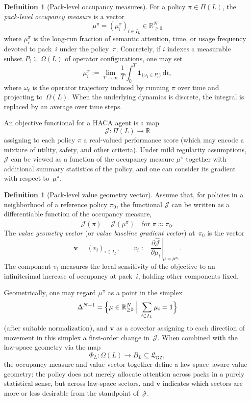 \documentclass[11pt]{book}
\theoremstyle{plain}
\theoremstyle{definition}
\newtheorem{definition}[theorem]{Definition}
\theoremstyle{remark}
\newcommand{\GZLS}{\ensuremath{\mathfrak{L}_{\mathrm{GZ}}}}       \newcommand{\GZLT}{\ensuremath{M_{!w}}}                           \newcommand{\GZLOC}{\ensuremath{A_M}}                             \newcommand{\GZLC}{\ensuremath{\omega_{\mathrm{law}}}}            \newcommand{\GZLCurv}{\ensuremath{\mathcal{F}_{\mathrm{law}}}}
\begin{document}
\begin{definition}[Pack-level occupancy measures]
\label{def:pack-occupancy-measures}
For a policy $\pi\in\Pi(L)$, the \emph{pack-level occupancy measure} is
a vector
\[
  \mu^\pi
  =
  (\mu_i^\pi)_{i\in I_L}
  \in\mathbb{R}_{\ge 0}^N
\]
where $\mu_i^\pi$ is the long-run fraction of semantic attention,
time, or usage frequency devoted to pack~$i$ under the policy~$\pi$.
Concretely, if $i$ indexes a measurable subset $P_i\subseteq\Omega(L)$
of operator configurations, one may set
\[
  \mu_i^\pi
  :=
  \lim_{T\to\infty}\frac{1}{T}\int_0^T
    \mathbf{1}_{\{\omega_t\in P_i\}}\,\mathrm{d}t,
\]
where $\omega_t$ is the operator trajectory induced by running $\pi$
over time and projecting to~$\Omega(L)$. When the underlying dynamics
is discrete, the integral is replaced by an average over time steps.
\end{definition}

An objective functional for a HACA agent is a map
\[
  \mathcal{J} : \Pi(L)\longrightarrow \mathbb{R}
\]
assigning to each policy $\pi$ a real-valued performance score
(which may encode a mixture of utility, safety, and other criteria).
Under mild regularity assumptions, $\mathcal{J}$ can be viewed as a
function of the occupancy measure $\mu^\pi$ together with additional
summary statistics of the policy, and one can consider its gradient
with respect to~$\mu^\pi$.

\begin{definition}[Pack-level value geometry vector]
\label{def:pack-value-geometry}
Assume that, for policies in a neighborhood of a reference policy
$\pi_0$, the functional $\mathcal{J}$ can be written as a differentiable
function of the occupancy measure,
\[
  \mathcal{J}(\pi)
  =
  \widehat{\mathcal{J}}(\mu^\pi)
  \quad\text{for }\pi\approx\pi_0.
\]
The \emph{value geometry vector} (or \emph{value baseline gradient
vector}) at~$\pi_0$ is the vector
\[
  \mathbf{v}
  =
  (v_i)_{i\in I_L},
  \qquad
  v_i
  :=
  \left.
    \frac{\partial \widehat{\mathcal{J}}}{\partial \mu_i}
  \right|_{\mu=\mu^{\pi_0}}.
\]
The component $v_i$ measures the local sensitivity of the objective to
an infinitesimal increase of occupancy at pack~$i$, holding other
components fixed.
\end{definition}

Geometrically, one may regard $\mu^\pi$ as a point in the simplex
\[
  \Delta^{N-1}
  =
  \Bigl\{
    \mu\in\mathbb{R}_{\ge 0}^N\;\Big|\;
    \sum_{i\in I_L}\mu_i = 1
  \Bigr\}
\]
(after suitable normalization), and $\mathbf{v}$ as a covector
assigning to each direction of movement in this simplex a first-order
change in~$\mathcal{J}$. When combined with the law-space geometry via
the map
\[
  \Phi_L : \Omega(L)\longrightarrow B_L\subseteq\GZLS,
\]
the occupancy measure and value vector together define a law-space–aware
value geometry: the policy does not merely allocate attention across
packs in a purely statistical sense, but across law-space sectors, and
$\mathbf{v}$ indicates which sectors are more or less desirable from
the standpoint of~$\mathcal{J}$.
\end{document}
